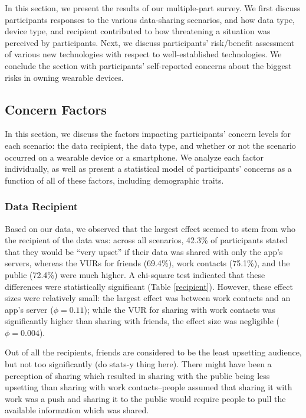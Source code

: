 \documentclass{acm_proc_article-sp}
\begin{document}
In this section, we present the results of our multiple-part survey. We first discuss participants responses to the various data-sharing scenarios, and how data type, device type, and recipient contributed to how threatening a situation was perceived by participants. Next, we discuss participants' risk/benefit assessment of various new technologies with respect to well-established technologies. We conclude the section with participants' self-reported concerns about the biggest risks in owning wearable devices.

\subsection{Concern Factors}

In this section, we discuss the factors impacting participants' concern levels for each scenario: the data recipient, the data type, and whether or not the scenario occurred on a wearable device or a smartphone. We analyze each factor individually, as well as present a statistical model of participants' concerns as a function of all of these factors, including demographic traits.

\subsubsection{Data Recipient}
Based on our data, we observed that the largest effect seemed to stem from who the recipient of the data was: across all scenarios, 42.3\% of participants stated that they would be ``very upset'' if their data was shared with only the app's servers, whereas the VURs for friends (69.4\%), work contacts (75.1\%), and the public (72.4\%) were much higher. A chi-square test indicated that these differences were statistically significant (Table \ref{recipient}). However, these effect sizes were relatively small: the largest effect was between work contacts and an app's server ($\phi=0.11$); while the VUR for sharing with work contacts was significantly higher than sharing with friends, the effect size was negligible ($\phi=0.004$).


Out of all the recipients, friends are considered to be the least upsetting audience, but not too significantly (do stats-y thing here). There might have been a perception of sharing which resulted in sharing with the public being less upsetting than sharing with work contacts--people assumed that sharing it with work was a push and sharing it to the public would require people to pull the available information which was shared.
\end{document}
